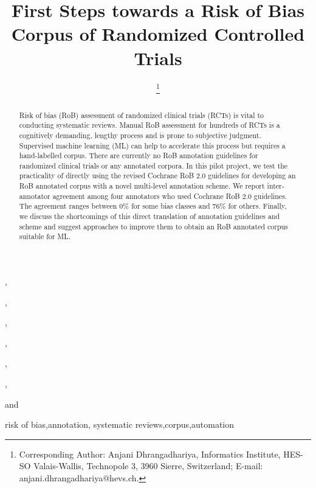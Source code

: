 \documentclass{IOS-Book-Article}
\def\hb{\hbox to 11.5 cm{}}
\begin{document}
\pagestyle{headings}
\def\thepage{}
\begin{frontmatter}              %


\title{First Steps towards a Risk of Bias Corpus of Randomized Controlled Trials}

\markboth{}{April 2022\hb}

\author[A,B]{ %
\thanks{Corresponding Author: Anjani Dhrangadhariya, Informatics Institute, HES-SO Valais-Wallis, Technopole 3,
3960 Sierre, Switzerland; E-mail:
anjani.dhrangadhariya@hevs.ch.}},
\author[C,D]{ }
,
\author[C,D]{ }
,
\author[C,D]{ }
,
\author[C,D]{ }
,
\author[C,D]{ }
,
\author[E,F]{ }
and
\author[A,B]{ }

\address[A]{Informatics Institute, HES-SO Valais-Wallis, Sierre, Switzerland}
\address[B]{University of Geneva (UNIGE), Geneva, Switzerland}
\address[C]{School of Health Sciences, HES-SO Valais-Wallis, Leukerbad, Switzerland.}
\address[D]{Department of Physiotherapy, HES-SO Valais-Wallis, Leukerbad, Switzerland.}
\address[E]{Geneva School of Business Administration, HES-SO Geneva, Switzerland.}
\address[F]{SIB Swiss Institute of Bioinformatics (SIB), Geneva, Switzerland}

\begin{abstract}
Risk of bias (RoB) assessment of randomized clinical trials (RCTs) is vital to conducting systematic reviews. 
Manual RoB assessment for hundreds of RCTs is a cognitively demanding, lengthy process and is prone to subjective judgment. 
Supervised machine learning (ML) can help to accelerate this process but requires a hand-labelled corpus.
There are currently no RoB annotation guidelines for randomized clinical trials or any annotated corpora.
In this pilot project, we test the practicality of directly using the revised Cochrane RoB 2.0 guidelines for developing an RoB annotated corpus with a novel multi-level annotation scheme.
We report inter-annotator agreement among four annotators who used Cochrane RoB 2.0 guidelines.
The agreement ranges between 0\% for some bias classes and 76\% for others.
Finally, we discuss the shortcomings of this direct translation of annotation guidelines and scheme and suggest approaches to improve them to obtain an RoB annotated corpus suitable for ML.
\end{abstract}

\begin{keyword}
risk of bias\sep annotation\sep
systematic reviews\sep corpus\sep automation
\end{keyword}
\end{frontmatter}
\markboth{April 2022\hb}{April 2022\hb}
%
%
%
\end{document}
